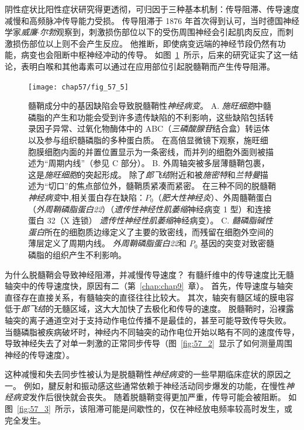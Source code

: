 阴性症状比阳性症状研究得更透彻，可归因于三种基本机制：传导阻滞、传导速度减慢和高频脉冲传导能力受损。
传导阻滞于 1876 年首次得到认可，当时德国神经学家\textit{威廉$\cdot$尔勃}观察到，刺激损伤部位以下的受伤周围神经会引起肌肉反应，而刺激损伤部位以上则不会产生反应。
他推断，即使病变远端的神经节段仍然有功能，病变也会阻断中枢神经冲动的传导。
如图~\ref{fig:57_5}~所示，后来的研究证实了这一结论，表明白喉和其他毒素可以通过在应用部位引起脱髓鞘而产生传导阻滞。


\begin{figure}[htbp]
	\centering
	\texttt{[image: chap57/fig\_57\_5]}
	\caption{髓鞘成分中的基因缺陷会导致脱髓鞘性\textit{神经病变}。
		A. \textit{施旺细胞}中髓磷脂的产生和功能会受到许多遗传缺陷的不利影响，这些缺陷包括转录因子异常、过氧化物酶体中的 ABC（\textit{三磷酸腺苷}结合盒）转运体以及参与组织髓磷脂的多种蛋白质。
		在高倍显微镜下观察，施旺细胞膜细胞内面的并置位置显示为一条密线，而并列的细胞外面则被描述为“周期内线”（参见 C 部分）\cite{lupski1998molecular}。 
		B. 外周轴突被多层薄髓鞘包裹，这是\textit{施旺细胞}的突起形成。
		除了\textit{郎飞结}附近和被\textit{施密特}和\textit{兰特曼}描述为“切口”的焦点部位外，髓鞘质紧凑而紧密。
		在三种不同的脱髓鞘\textit{神经病变}中,相关蛋白存在缺陷：$ P_0 $（\textit{肥大性神经炎}）、外周髓鞘蛋白（\textit{外周鞘磷脂蛋白22}）（\textit{遗传性神经性肌萎缩}神经病变 1 型）和连接蛋白 32（X 连锁） \textit{遗传性神经性肌萎缩}神经病变）\cite{lupski1998molecular}。
		C. \textit{髓磷脂碱性蛋白}所在的细胞质边缘定义了主要的致密线，而残留在细胞外空间的薄层定义了周期内线。
		\textit{外周鞘磷脂蛋白22}和 $P_0$ 基因的突变对致密髓磷脂的组织产生不利影响\cite{brown2002inherited}。}
	\label{fig:57_5}
\end{figure}


为什么脱髓鞘会导致神经阻滞，并减慢传导速度？
有髓纤维中的传导速度比无髓轴突中的传导速度快，原因有二（第~\ref{chap:chap9}~章）。
首先，传导速度与轴突直径存在直接关系，有髓轴突的直径往往比较大。
其次，轴突有髓区域的膜电容低于\textit{郎飞结}的无髓区域，这大大加快了去极化和传导的速度。
脱髓鞘时，沿裸露轴突的离子通道空对于支持动作电位传播不是最佳的，甚至可能导致传导失败。
当髓磷脂被疾病破坏时，神经内不同轴突的动作电位开始以略有不同的速度传导，导致神经失去了对单一刺激的正常同步传导（图~\ref{fig:57_2}~显示了如何测量周围神经的传导速度）。


这种减慢和失去同步性被认为是脱髓鞘性\textit{神经病变}的一些早期临床症状的原因之一。
例如，腱反射和振动感这些通常依赖于神经活动同步爆发的功能，在慢性\textit{神经病变}发作后很快就会丧失。
随着脱髓鞘变得更加严重，传导可能会被阻断。
如图~\ref{fig:57_3}~所示，该阻滞可能是间歇性的，仅在神经放电频率较高时发生，或完全发生。



